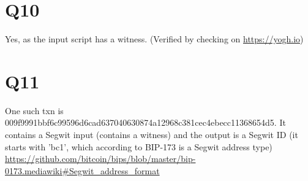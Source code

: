 \documentclass{article}
\begin{document}
\section{Q10}
Yes, as the input script has a witness. (Verified by checking on \url{https://yogh.io})

\section{Q11}
One such txn is 009f9991bbf6c99596d6cad637040630874a12968c381cec4ebecc11368654d5. It contains a Segwit input (contains a witness) and the output is a Segwit ID (it starts with 'bc1', which according to BIP-173 is a Segwit address type)\\
\url{https://github.com/bitcoin/bips/blob/master/bip-0173.mediawiki#Segwit_address_format}
\end{document}
